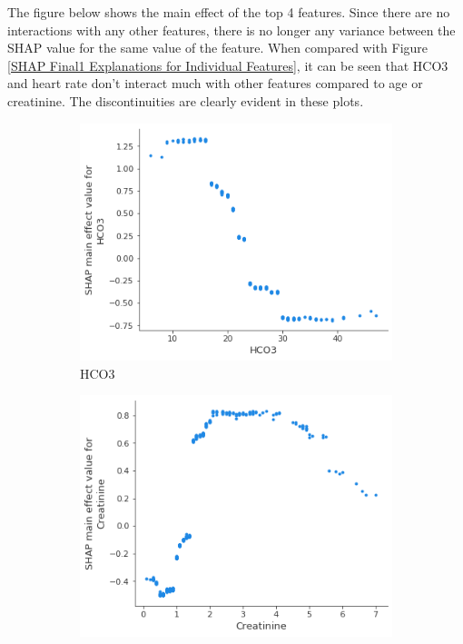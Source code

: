 \documentclass[12pt]{article}
\begin{document}
The figure below shows the main effect of the top 4 features. Since there are no interactions with any other features, there is no longer any variance between the SHAP value for the same value of the feature. When compared with Figure \ref{SHAP Final1 Explanations for Individual Features}, it can be seen that HCO3 and heart rate don't interact much with other features compared to age or creatinine. The discontinuities are clearly evident in these plots.

\begin{figure}[H]
     \centering
     \begin{subfigure}[b]{0.47\textwidth}
         \centering
         \includegraphics[width=\linewidth]{TreeExplainer Final1 Global/TreeExplainer Final1 Main Effect HCO3.png}
         \caption{HCO3}
     \end{subfigure}
     \hfill
     \begin{subfigure}[b]{0.47\textwidth}
         \centering
         \includegraphics[width=\linewidth]{TreeExplainer Final1 Global/TreeExplainer Final1 Main Effect Creatinine.png}

\end{subfigure}
\end{figure}
\end{document}
